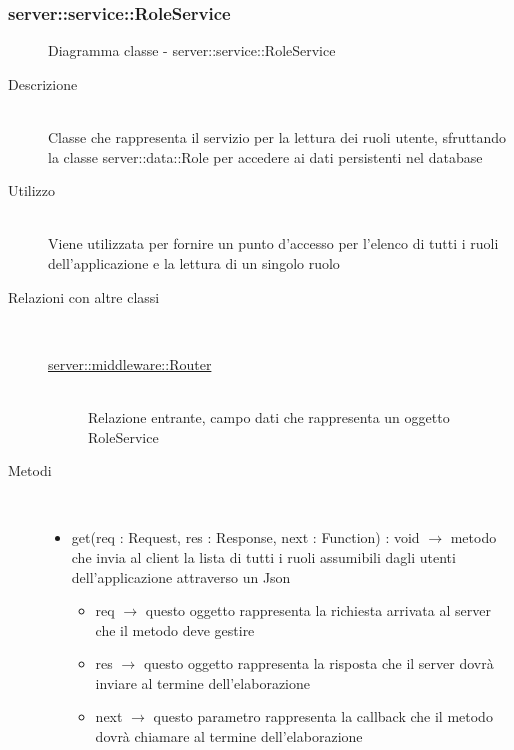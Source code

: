 \subsubsection[RoleService]{server::service::RoleService}
\begin{figure}[H]
	\centering
	\caption{Diagramma classe - server::service::RoleService}
\end{figure}\begin{description}
\item[Descrizione] \hfill \\
Classe che rappresenta il servizio per la lettura dei ruoli utente, sfruttando la classe server::data::Role per accedere ai dati persistenti nel database
\item[Utilizzo] \hfill \\
Viene utilizzata per fornire un punto d'accesso per l'elenco di tutti i ruoli dell'applicazione e la lettura di un singolo ruolo
\item[Relazioni con altre classi] \hfill \\
\vspace{-7mm}
\begin{description}
	\item[\hyperlink{server::middleware::Router}{server::middleware::Router}] \hfill \\
	Relazione entrante, campo dati che rappresenta un oggetto RoleService
\end{description}

\item[Metodi] \hfill \\
\vspace{-7mm}
\begin{itemize}
	\item get(req : Request, res : Response, next : Function) : void $\rightarrow$ metodo che invia al client la lista di tutti i ruoli assumibili dagli utenti dell'applicazione attraverso un Json\begin{itemize}
		\item req $\rightarrow$ questo oggetto rappresenta la richiesta arrivata al server che il metodo deve gestire
		\item res $\rightarrow$ questo oggetto rappresenta la risposta che il server dovrà inviare al termine dell'elaborazione
		\item next $\rightarrow$ questo parametro rappresenta la callback che il metodo dovrà chiamare al termine dell’elaborazione
	\end{itemize}
	

\end{itemize}
\end{description}

